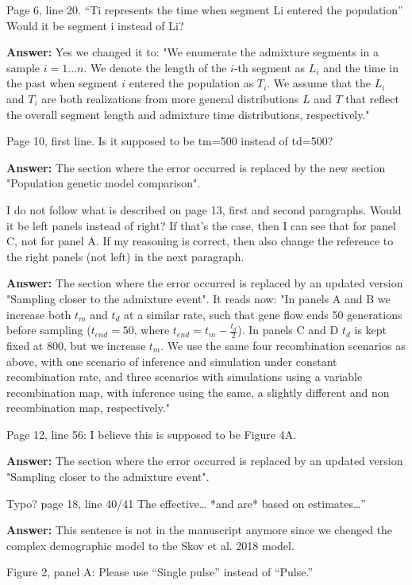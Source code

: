 \documentclass[11pt]{article}
\begin{document}
Page 6, line 20. “Ti represents the time when segment Li entered the population” Would it be segment i instead of Li? 

\textbf{Answer:} Yes we changed it to: "We enumerate the admixture segments in a sample $i=1...n$. We denote the length of the $i$-th segment as $L_i$ and the time in the past when segment $i$ entered the population as $T_i$. We assume that the $L_i$ and $T_i$ are both realizations from more general distributions $L$ and $T$ that reflect the overall segment length and admixture time distributions, respectively."

Page 10, first line. Is it supposed to be tm=500 instead of td=500?

\textbf{Answer:} The section where the error occurred is replaced by the new section "Population genetic model comparison".


I do not follow what is described on page 13, first and second paragraphs. Would it be left panels instead of right? If that’s the case, then I can see that for panel C, not for panel A. If my reasoning is correct, then also change the reference to the right panels (not left) in the next paragraph.

\textbf{Answer:} The section where the error occurred is replaced by an updated version "Sampling closer to the admixture event". It reads now: "In panels A and B we increase both $t_m$ and $t_d$ at a similar rate, such that gene flow ends 50 generations before sampling ($t_{end}=50$, where $t_{end}= t_m - \frac{t_d}{2}$). In panels C and D $t_d$ is kept fixed at 800, but we increase $t_m$. We use the same four recombination scenarios as above, with one scenario of inference and simulation under constant recombination rate, and three scenarios with simulations using a variable recombination map, with inference using the same, a slightly different and non recombination map, respectively."

Page 12, line 56: I believe this is supposed to be Figure 4A. 

\textbf{Answer:} The section where the error occurred is replaced by an updated version "Sampling closer to the admixture event".

Typo? page 18, line 40/41 The effective… *and are* based on estimates…” 

\textbf{Answer:} This sentence is not in the manuscript anymore since we chenged the complex demographic model to the Skov et al. 2018 model.

Figure 2, panel A: Please use “Single pulse” instead of “Pulse.”
\end{document}
